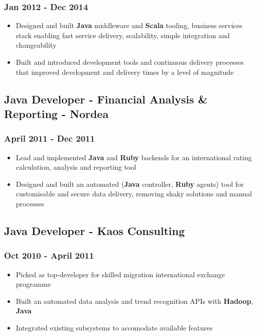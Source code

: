 \documentclass[11pt]{article}
\begin{document}
\subsubsection*{Jan 2012 - Dec 2014}
\label{sec:orgf42dee1}
\begin{itemize}
\item Designed and built \textbf{Java} middleware and \textbf{Scala} tooling, business services stack enabling fast service delivery, scalability, simple integration and changeability
\item Built and introduced development tools and continuous delivery processes that improved development and delivery times by a level of magnitude
\end{itemize}
\subsection*{Java Developer - Financial Analysis \& Reporting - Nordea}
\label{sec:orgb4565bd}
\subsubsection*{April 2011 - Dec 2011}
\label{sec:org4b93e75}
\begin{itemize}
\item Lead and implemented \textbf{Java} and \textbf{Ruby} backends for an international rating calculation, analysis and reporting tool
\item Designed and built an automated (\textbf{Java} controller, \textbf{Ruby} agents) tool for customisable and secure data delivery, removing shaky solutions and manual processes
\end{itemize}
\subsection*{Java Developer - Kaos Consulting}
\label{sec:org3fa9638}
\subsubsection*{Oct 2010 - April 2011}
\label{sec:orgb76eafa}
\begin{itemize}
\item Picked as top-developer for skilled migration international exchange programme
\item Built an automated data analysis and trend recognition APIs with \textbf{Hadoop}, \textbf{Java}
\item Integrated existing subsystems to accomodate available features
\end{itemize}
\end{document}
